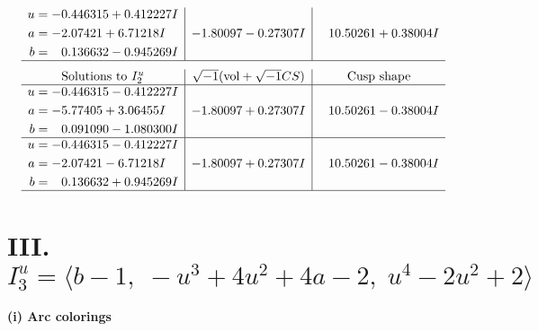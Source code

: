 \documentclass[1p]{elsarticle_modified}
\theoremstyle{definition}
\newcommand{\I}{\sqrt{-1}}
\begin{document}
$$\begin{array}{c|c|c}
\begin{aligned}
u &= -0.446315 + 0.412227 I \\
a &= -2.07421 + 6.71218 I \\
b &= \phantom{-}0.136632 - 0.945269 I\end{aligned}
 & -1.80097 - 0.27307 I & \phantom{-}10.50261 + 0.38004 I\\
 \hline 
 \end{array}$$\newpage$$\begin{array}{c|c|c}  
\text{Solutions to }I^u_{2}& \I (\text{vol} + \sqrt{-1}CS) & \text{Cusp shape}\\
 \hline 
\begin{aligned}
u &= -0.446315 - 0.412227 I \\
a &= -5.77405 + 3.06455 I \\
b &= \phantom{-}0.091090 - 1.080300 I\end{aligned}
 & -1.80097 + 0.27307 I & \phantom{-}10.50261 - 0.38004 I \\ \hline\begin{aligned}
u &= -0.446315 - 0.412227 I \\
a &= -2.07421 - 6.71218 I \\
b &= \phantom{-}0.136632 + 0.945269 I\end{aligned}
 & -1.80097 + 0.27307 I & \phantom{-}10.50261 - 0.38004 I\\
 \hline 
 \end{array}$$\newpage\newpage\renewcommand{\arraystretch}{1}
\centering \section*{III. $I^u_{3}= \langle b-1,\;- u^3+4 u^2+4 a-2,\;u^4-2 u^2+2 \rangle$}
\flushleft \textbf{(i) Arc colorings}\\
\end{document}
